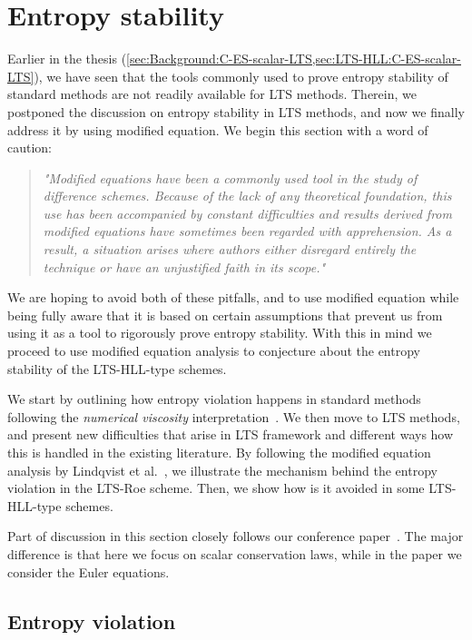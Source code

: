 
\section{Entropy stability}
\label{sec:EV-ME}

Earlier in the thesis (\cref{sec:Background:C-ES-scalar-LTS,sec:LTS-HLL:C-ES-scalar-LTS}), we have seen that the tools commonly used to prove entropy stability of standard methods are not readily available for LTS methods. Therein, we postponed the discussion on entropy stability in LTS methods, and now we finally address it by using modified equation. We begin this section with a word of caution:
\begin{quote}
\small
\textit{"Modified equations have been a commonly used tool in the study of difference schemes. Because of the lack of any theoretical foundation, this use has been accompanied by constant difficulties and results derived from modified equations have sometimes been
regarded with apprehension. As a result, a situation arises where authors either
disregard entirely the technique or have an unjustified faith in its scope."}
\end{quote}
\vspace{-2.5mm}
We are hoping to avoid both of these pitfalls, and to use modified equation while being fully aware that it is based on certain assumptions that prevent us from using it as a tool to rigorously prove entropy stability. With this in mind we proceed to use modified equation analysis to conjecture about the entropy stability of the LTS-HLL-type schemes.

We start by outlining how entropy violation happens in standard methods following the \textit{numerical viscosity} interpretation~\cite{lev02}. We then move to LTS methods, and present new difficulties that arise in LTS framework and different ways how this is handled in the existing literature. By following the modified equation analysis by Lindqvist et al.~\cite{lin16}, we illustrate the mechanism behind the entropy violation in the LTS-Roe scheme. Then, we show how is it avoided in some LTS-HLL-type schemes.

Part of discussion in this section closely follows our conference paper~\cite{cp2}. The major difference is that here we focus on scalar conservation laws, while in the paper we consider the Euler equations.

\subsection{Entropy violation}

